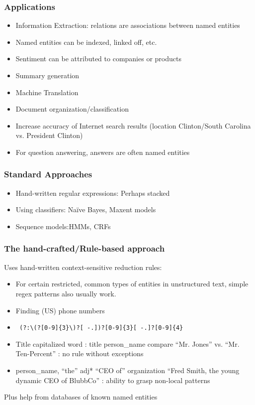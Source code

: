 \begin{frame}[fragile]\frametitle{Applications}
  \begin{itemize}
  \item Information Extraction:  relations are associations between named entities
  \item Named entities can be indexed, linked off, etc.
  \item Sentiment can be attributed to companies or products
  \item Summary generation
  \item Machine Translation
  \item Document organization/classification
  \item Increase accuracy of Internet search results (location Clinton/South Carolina vs. President Clinton)
  \item For question answering, answers are often named entities
  \end{itemize}
\end{frame}

\begin{frame}[fragile]\frametitle{Standard Approaches}
  \begin{itemize}
  \item Hand-written regular expressions:  Perhaps stacked
  \item Using classifiers: Naïve Bayes, Maxent models
  \item Sequence models:HMMs, CRFs
  \end{itemize}
\end{frame}

\begin{frame}[fragile]\frametitle{The hand-crafted/Rule-based approach}
Uses hand-written context-sensitive reduction rules:
  \begin{itemize}
  \item For certain restricted, common types of entities in unstructured 
text, simple regex patterns also usually work.
  \item Finding (US) phone numbers
  \item \lstinline| (?:\(?[0-9]{3}\)?[ -.])?[0-9]{3}[ -.]?[0-9]{4}|
  \item Title capitalized word : title person\_name compare ``Mr. Jones'' vs. ``Mr. Ten-Percent'' : no rule without exceptions
  \item  person\_name, ``the'' adj* ``CEO of'' organization ``Fred Smith, the young dynamic CEO of BlubbCo'' : ability to grasp non-local patterns
  \end{itemize}
  Plus help from databases of known named entities

\end{frame}

